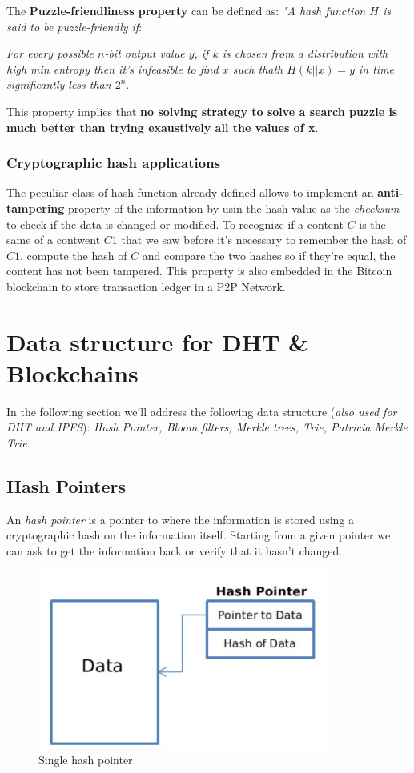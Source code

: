 \documentclass[10pt,a4paper]{report}
\begin{document}
The \textbf{Puzzle-friendliness property} can be defined as: \textit{"A hash function $H$ is said to be puzzle-friendly if}:
	\begin{center}
	\textit{For every possible $n$-bit output value $y$, if $k$ is chosen from a distribution with high min entropy then it's infeasible to find $x$ such thath $H(k||x) = y$ in time significantly less than $2^{n}$}.
	\end{center}

This property implies that \textbf{no solving strategy to solve a search puzzle is much better than trying exaustively all the values of x}.
\subsubsection{Cryptographic hash applications}\label{sec:cryptographic-hash-applications}
The peculiar class of hash function already defined allows to implement an \textbf{anti-tampering} property of the information by usin the hash value as the \textit{checksum} to check if the data is changed or modified. To recognize if a content $C$ is the same of a contwent $C1$ that we saw before it's necessary to remember the hash of $C1$, compute the hash of $C$ and compare the two hashes so if they're equal, the content has not been tampered. This property is also embedded in the Bitcoin blockchain to store transaction ledger in a P2P Network.


\section{Data structure for DHT \& Blockchains}\label{sec:data-structure-for-dht--blockchains}
In the following section we'll address the following data structure (\textit{also used for DHT and IPFS}): \textit{	Hash Pointer, Bloom filters, Merkle trees, Trie, Patricia Merkle Trie}.

\subsection{Hash Pointers}\label{sec:1-hash-pointers}
An \textit{hash pointer} is a pointer to where the information is stored using a cryptographic hash on the information itself. Starting from a given pointer we can ask to get the information back or verify that it hasn't changed.
\begin{figure}[h]
	\centering
	\includegraphics[scale=0.40]{images/Pasted image 20230317155927.png}
	\caption{Single hash pointer}
	
\end{figure}
\end{document}
